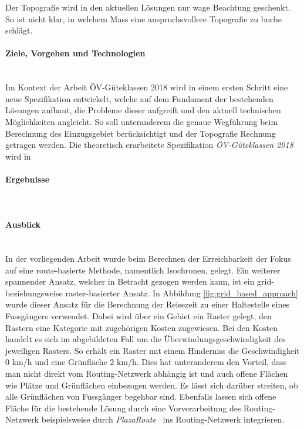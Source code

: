 Der Topografie wird in den aktuellen Lösungen nur wage Beachtung geschenkt.
So ist nicht klar, in welchem Mass eine anspruchsvollere Topografie zu buche schlägt.

\paragraph{Ziele, Vorgehen und Technologien}~\\
Im Kontext der Arbeit ÖV-Güteklassen 2018 wird in einem ersten Schritt eine neue Spezifikation entwickelt, welche auf dem Fundament der bestehenden Lösungen aufbaut, die Probleme dieser aufgreift und den aktuell technischen Möglichkeiten angleicht.
So soll unteranderem die genaue Wegführung beim Berechnung des Einzugsgebiet berücksichtigt und der Topografie Rechnung getragen werden.
Die theoretisch erarbeitete Spezifikation \emph{ÖV-Güteklassen 2018} wird in 


\paragraph{Ergebnisse}~\\


\paragraph{Ausblick}~\\
In der vorliegenden Arbeit wurde beim Berechnen der Erreichbarkeit der Fokus auf eine route-basierte Methode, namentlich Isochronen, gelegt.
Ein weiterer spannender Ansatz, welcher in Betracht gezogen werden kann, ist ein grid- beziehungsweise raster-basierter Ansatz.
In Abbildung \ref{fig:grid_based_approach} wurde dieser Ansatz für die Berechnung der Reisezeit zu einer Haltestelle eines Fussgängers verwendet.
Dabei wird über ein Gebiet ein Raster gelegt, den Rastern eine Kategorie mit zugehörigen Kosten zugewiesen.
Bei den Kosten handelt es sich im abgebildeten Fall um die Überwindungsgeschwindigkeit des jeweiligen Rasters.
So erhält ein Raster mit einem Hinderniss die Geschwindigkeit 0 km/h und eine Grünfläche 2 km/h.
Dies hat unteranderem den Vorteil, dass man nicht direkt vom Routing-Netzwerk abhängig ist und auch offene Flächen wie Plätze und Grünflächen einbezogen werden.
Es lässt sich darüber streiten, ob alle Grünflächen von Fussgänger begehbar sind.
Ebenfalls lassen sich offene Fläche für die bestehende Lösung durch eine Vorverarbeitung des Routing-Netzwerk beispielsweise durch \emph{PlazaRoute}~\cite{plaza_route} ins Routing-Netzwerk integrieren.

